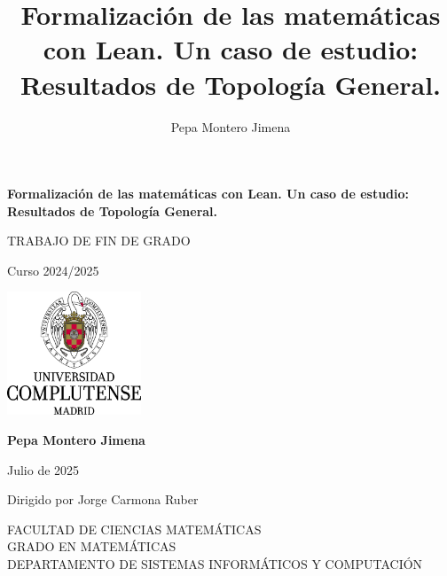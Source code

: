 \documentclass{article}
\title{Formalización de las matemáticas con Lean. Un caso de estudio: Resultados de Topología General.}
\author{Pepa Montero Jimena}
\date{}
\begin{document}


\vspace{2cm}

\begin{center}
    {\LARGE \textbf{Formalización de las matemáticas con Lean. Un caso de estudio: Resultados de Topología General.}\par}
    \vspace{0.5cm}
    
    {\Large TRABAJO DE FIN DE GRADO\par}
    
    {\large Curso 2024/2025\par}
    
    \vspace{2cm}
    
    \includegraphics[width=0.3\textwidth]{figuras/logo.png}
    
    \vspace{2cm}
    
    {\large \textbf{Pepa Montero Jimena}\par}
    \vspace{0.2cm}
    {\large Julio de 2025\par}
    \vspace{0.2cm}
    {\large Dirigido por Jorge Carmona Ruber\par}
\end{center}

\vfill

{\small
FACULTAD DE CIENCIAS MATEMÁTICAS\\
GRADO EN MATEMÁTICAS\\
DEPARTAMENTO DE SISTEMAS INFORMÁTICOS Y COMPUTACIÓN
}


\newpage
\tableofcontents


\newpage
{} %


\newpage


\newpage %



\newpage %



\newpage %







\end{document}

